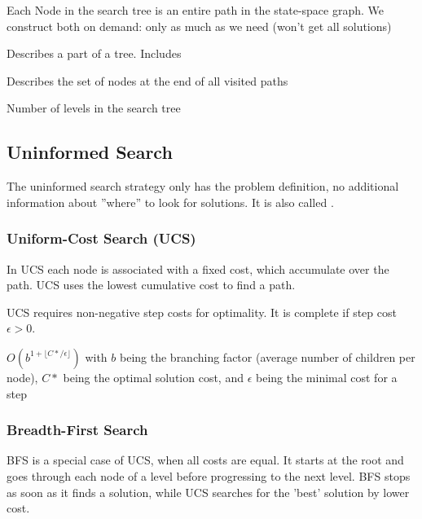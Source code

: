 \documentclass[
../EiKI_Summary.tex,
]
{subfiles}
\begin{document}
Each Node in the search tree is an entire path in the state-space graph. We construct both on demand: only as much as we need (won't get all solutions)

\begin{defbox}
    [Node]
    Describes a part of a tree. Includes 
\end{defbox}

\begin{defbox}
    [Fringe]
    Describes the set of nodes at the end of all visited paths
\end{defbox}

\begin{defbox}
    [Depth]
    Number of levels in the search tree
\end{defbox}

\subsection{Uninformed Search}
\begin{defbox}
    [Definition]
    The uninformed search strategy only has the problem definition, no additional information about ''where'' to look for solutions. It is also called .
\end{defbox}

\subsubsection{Uniform-Cost Search (UCS)}
In UCS each node is associated with a fixed cost, which accumulate over the path. UCS uses the lowest cumulative cost to find a path.

UCS requires non-negative step costs for optimality. It is complete if step cost $\epsilon > 0$. 

 $O(b^{1 + \lfloor C* / \epsilon\rfloor})$ with $b$ being the branching factor (average number of children per node), $C*$ being the optimal solution cost, and $\epsilon$ being the minimal cost for a step

\subsubsection{Breadth-First Search}
BFS is a special case of UCS, when all costs are equal. It starts at the root and goes through each node of a level before progressing to the next level. BFS stops as soon as it finds a solution, while UCS searches for the 'best' solution by lower cost.
\end{document}
